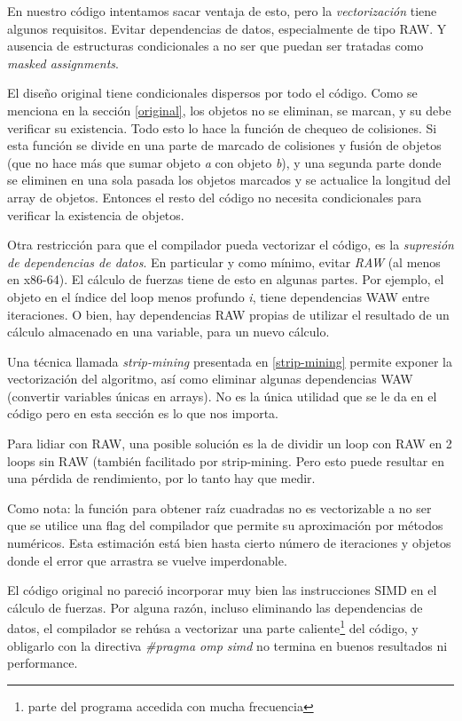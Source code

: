 \documentclass{article}
\begin{document}
En nuestro código intentamos sacar ventaja de esto, pero la \textit{vectorización} tiene algunos requisitos.
Evitar dependencias de datos, especialmente de tipo RAW. Y ausencia de estructuras condicionales a no ser
que puedan ser tratadas como \textit{masked assignments}.


El diseño original tiene condicionales dispersos por todo el código. Como se menciona en
la sección \ref{original}, los objetos no se eliminan, se marcan, y su debe verificar su existencia.
Todo esto lo hace la función de chequeo de colisiones. Si esta función se divide en una parte de marcado
de colisiones y fusión de objetos (que no hace más que sumar objeto \textit{a} con objeto \textit{b}), y
una segunda parte donde se eliminen en una sola pasada los objetos marcados y se actualice la longitud
del array de objetos. Entonces el resto del código no necesita condicionales para verificar la existencia de objetos.


Otra restricción para que el compilador pueda vectorizar el código, es la \textit{supresión de dependencias de datos}.
En particular y como mínimo, evitar \textit{RAW} (al menos en x86-64). El cálculo de fuerzas tiene de esto en algunas
partes. Por ejemplo, el objeto en el índice del loop menos profundo \textit{i}, tiene dependencias WAW entre iteraciones.
O bien, hay dependencias RAW propias de utilizar el resultado de un cálculo almacenado en una variable, para un nuevo cálculo.


Una técnica llamada \textit{strip-mining} presentada en \ref{strip-mining} permite exponer la vectorización
del algoritmo, así como eliminar algunas dependencias WAW (convertir variables únicas en arrays). No es
la única utilidad que se le da en el código pero en esta sección es lo que nos importa.


Para lidiar con RAW, una posible solución es la de dividir un loop con RAW en 2 loops sin RAW (también
facilitado por strip-mining. Pero esto puede resultar en una pérdida de rendimiento, por lo tanto
hay que medir.


Como nota: la función para obtener raíz cuadradas no es vectorizable a no ser que se utilice una flag
del compilador que permite su aproximación por métodos numéricos. Esta estimación está bien hasta
cierto número de iteraciones y objetos donde el error que arrastra se vuelve imperdonable.


El código original no pareció incorporar muy bien las instrucciones SIMD en el cálculo de fuerzas.
Por alguna razón, incluso eliminando las dependencias de datos, el compilador se rehúsa a vectorizar
una parte caliente\footnote{parte del programa accedida con mucha frecuencia} del código, y obligarlo
con la directiva \textit{\#pragma omp simd} no termina en buenos resultados ni performance.
\end{document}
